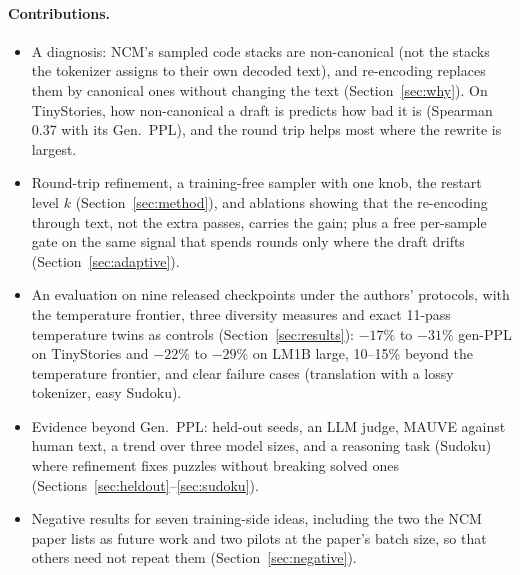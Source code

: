 \documentclass[10pt]{article}
\begin{document}
\paragraph{Contributions.}
\begin{itemize}
\item A diagnosis: NCM's sampled code stacks are non-canonical (not the stacks the tokenizer assigns to their own decoded text), and re-encoding replaces them by canonical ones without changing the text (Section~\ref{sec:why}). On TinyStories, how non-canonical a draft is predicts how bad it is (Spearman 0.37 with its Gen.\ PPL), and the round trip helps most where the rewrite is largest.
\item Round-trip refinement, a training-free sampler with one knob, the restart level $k$ (Section~\ref{sec:method}), and ablations showing that the re-encoding through text, not the extra passes, carries the gain; plus a free per-sample gate on the same signal that spends rounds only where the draft drifts (Section~\ref{sec:adaptive}).
\item An evaluation on nine released checkpoints under the authors' protocols, with the temperature frontier, three diversity measures and exact 11-pass temperature twins as controls (Section~\ref{sec:results}): $-17\%$ to $-31\%$ gen-PPL on TinyStories and $-22\%$ to $-29\%$ on LM1B large, 10--15\% beyond the temperature frontier, and clear failure cases (translation with a lossy tokenizer, easy Sudoku).
\item Evidence beyond Gen.\ PPL: held-out seeds, an LLM judge, MAUVE against human text, a trend over three model sizes, and a reasoning task (Sudoku) where refinement fixes puzzles without breaking solved ones (Sections~\ref{sec:heldout}--\ref{sec:sudoku}).
\item Negative results for seven training-side ideas, including the two the NCM paper lists as future work and two pilots at the paper's batch size, so that others need not repeat them (Section~\ref{sec:negative}).
\end{itemize}
\end{document}
